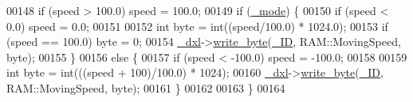 \begin{DoxyCode}
00148     \textcolor{keywordflow}{if} (speed > 100.0) speed = 100.0;
00149     \textcolor{keywordflow}{if} (\hyperlink{a00001_a2fd07e2e636003227a32d09d211bd6d4}{\_mode}) \{
00150         \textcolor{keywordflow}{if} (speed < 0.0) speed = 0.0;
00151         
00152         \textcolor{keywordtype}{int} byte = int((speed/100.0) * 1024.0);
00153         \textcolor{keywordflow}{if} (speed == 100.0) byte = 0;
00154         \hyperlink{a00001_a16df7ccc0a8d3c585a93b6916734bb17}{\_dxl}->\hyperlink{a00003_a66c1e32cc45dd46d329f1fc212e46a3d}{write\_byte}(\hyperlink{a00001_a0ae2b35fee3d120075e1d8f1e2055804}{\_ID}, RAM::MovingSpeed, byte);        
00155     \}
00156     \textcolor{keywordflow}{else} \{
00157         \textcolor{keywordflow}{if} (speed < -100.0) speed = -100.0;   
00158         
00159         \textcolor{keywordtype}{int} byte = int(((speed + 100)/100.0) * 1024);
00160         \hyperlink{a00001_a16df7ccc0a8d3c585a93b6916734bb17}{\_dxl}->\hyperlink{a00003_a66c1e32cc45dd46d329f1fc212e46a3d}{write\_byte}(\hyperlink{a00001_a0ae2b35fee3d120075e1d8f1e2055804}{\_ID}, RAM::MovingSpeed, byte);
00161     \}
00162 
00163 \}
00164 
\end{DoxyCode}
